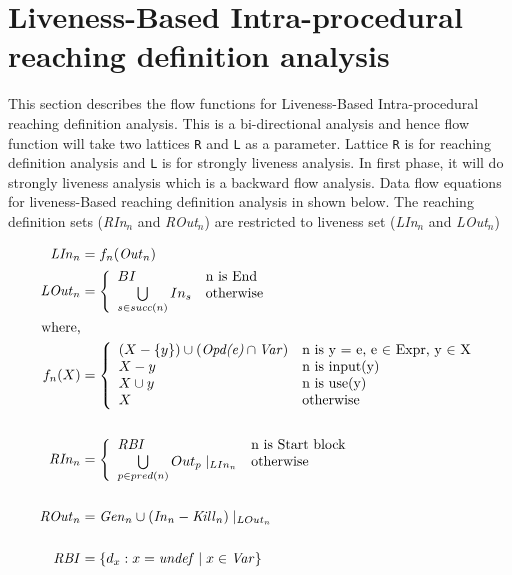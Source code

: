 \documentclass[11pt,a4paper,openright]{report}
\begin{document}
\section{Liveness-Based Intra-procedural reaching definition analysis}
This section describes the flow functions for Liveness-Based Intra-procedural reaching definition analysis. This is a bi-directional
analysis and hence flow function will take two lattices \texttt{R} and \texttt{L} as a parameter. Lattice \texttt{R} is for reaching definition analysis and
\texttt{L} is for strongly liveness analysis. In first phase, it will do strongly liveness analysis which is a backward flow analysis.
Data flow equations for liveness-Based reaching definition analysis in shown below. The reaching definition sets (\textit{RIn}$_n$ and \textit{ROut}$_n$) are restricted 
to liveness set (\textit{LIn}$_n$ and \textit{LOut}$_n$)

\begin{equation}
\begin{split}
\mbox{\textit{LIn}}_n &= f_n(\mbox{\textit{Out}}_n) \\
\mbox{\textit{LOut}}_n &= \left\{ \begin{array}{ll}
	  BI & \mbox{n is End}\\
	  \bigcup\limits_{s \in succ(n)} In_s & \mbox{otherwise}
	  \end{array} \right.\\ 
\mbox{where,}\\
f_n(X) &= \left\{ \begin{array}{ll}
	  (X-\{y\})\cup(\mbox{\textit{Opd(e)}}\cap \mbox{\textit{Var}}) & \mbox{n is y = e, e $\in$ Expr, y $\in$ X}\\
	  X-{y} & \mbox{n is input(y)}\\
	  X \cup {y} & \mbox{n is use(y)} \\
	  X & \mbox{otherwise}
	  \end{array} \right.\\ 
\\
\mbox{\textit{RIn}}_n &= \left\{ \begin{array}{ll}
	  \mbox{\textit{RBI}} & \mbox{n is Start block}\\
	  \bigcup\limits_{p \in pred(n)}Out_p\mid_{LIn_n} & \mbox{otherwise}
	  \end{array} \right.\\ 
	  \\
\mbox{\textit{ROut}}_n &= \mbox{\textit{Gen}}_n \cup (\mbox{\textit{In}}_n - \mbox{\textit{Kill}}_n) \mid_{LOut_n} \\
\\
\mbox{\textit{RBI}} &= \{d_x : x = \mbox{\textit{undef}} \mid x \in \mbox{\textit{Var}}\} \\	  
\end{split} 
\end{equation}
\end{document}
